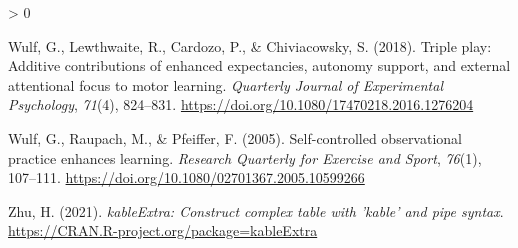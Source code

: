 \documentclass[
  english,
  man,floatsintext]{apa7}
\newlength{\cslhangindent}
\newenvironment{CSLReferences}[2] %
 {%
  \setlength{\parindent}{0pt}
  \ifodd #1 \everypar{\setlength{\hangindent}{\cslhangindent}}\ignorespaces\fi
  \ifnum #2 > 0
  \setlength{\parskip}{#2\baselineskip}
  \fi
 }%
 {}
\begin{document}
\begin{CSLReferences}{1}{0}
\leavevmode\hypertarget{ref-wulf2018}{}%
Wulf, G., Lewthwaite, R., Cardozo, P., \& Chiviacowsky, S. (2018). Triple play: Additive contributions of enhanced expectancies, autonomy support, and external attentional focus to motor learning. \emph{Quarterly Journal of Experimental Psychology}, \emph{71}(4), 824--831. \url{https://doi.org/10.1080/17470218.2016.1276204}

\leavevmode\hypertarget{ref-wulf2005}{}%
Wulf, G., Raupach, M., \& Pfeiffer, F. (2005). Self-controlled observational practice enhances learning. \emph{Research Quarterly for Exercise and Sport}, \emph{76}(1), 107--111. \url{https://doi.org/10.1080/02701367.2005.10599266}

\leavevmode\hypertarget{ref-R-kableExtra}{}%
Zhu, H. (2021). \emph{kableExtra: Construct complex table with 'kable' and pipe syntax}. \url{https://CRAN.R-project.org/package=kableExtra}

\end{CSLReferences}
\end{document}
